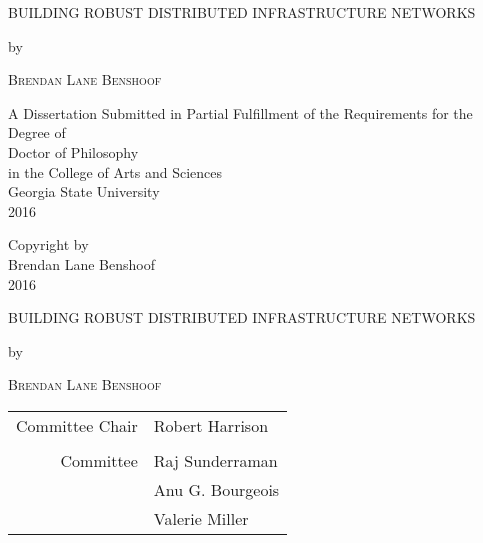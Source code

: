\documentclass[12pt,letterpaper]{report}
\begin{document}
	\newpage 
	\begin{titlepage}
		
		\begin{center}
			{\scshape BUILDING ROBUST DISTRIBUTED INFRASTRUCTURE NETWORKS\par}
			\vspace{5cm}
			{by\par}
			\vspace{5cm}
			{\scshape Brendan Lane Benshoof\par}
			
			\vfill
			A Dissertation Submitted in Partial Fulfillment of the Requirements for the Degree of\\
			Doctor of Philosophy\\
			in the College of Arts and Sciences\\
			Georgia State University\\
			2016
		\end{center}
	\end{titlepage}
	
	
	
	
	
	
	\null\vfill
	\begin{center}
		
		Copyright by \\
		Brendan Lane Benshoof\\
		2016
	\end{center}
	\newpage
	
	
	
	\begin{center}
		{\scshape BUILDING ROBUST DISTRIBUTED INFRASTRUCTURE NETWORKS\par}
		\vspace{5cm}
		{by\par}
		\vspace{5cm}
		{\scshape Brendan Lane Benshoof\par}
	\end{center}
	\vfill
	\hfill\begin{tabular}{rl}
		Committee Chair & Robert Harrison \\ 
		&  \\ 
		Committee &  Raj Sunderraman \\ 
		& Anu G. Bourgeois\\ 
		& Valerie Miller 
	\end{tabular} 
	
\end{document}
